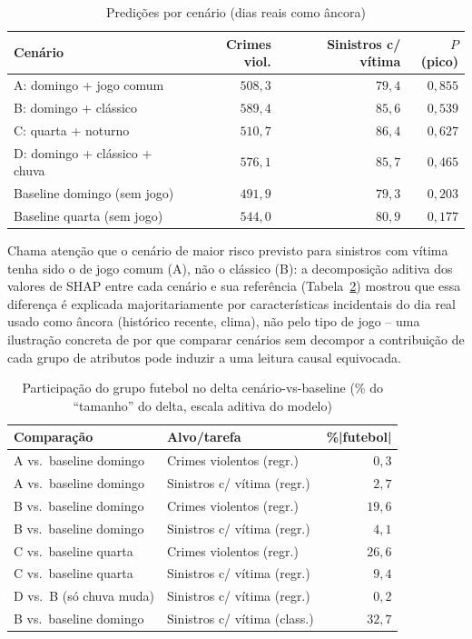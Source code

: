 \documentclass[12pt]{article}
\begin{document}
\begin{table}[ht]
\centering
\caption{Predições por cenário (dias reais como âncora)}
\label{tab:cenarios}
\small
\begin{tabular}{@{}lrrr@{}}
\toprule
\textbf{Cenário} & \textbf{Crimes viol.} & \textbf{Sinistros c/ vítima} & \textbf{$P$(pico)} \\
\midrule
A: domingo + jogo comum      & $508,3$ & $79,4$ & $0,855$ \\
B: domingo + clássico        & $589,4$ & $85,6$ & $0,539$ \\
C: quarta + noturno          & $510,7$ & $86,4$ & $0,627$ \\
D: domingo + clássico + chuva & $576,1$ & $85,7$ & $0,465$ \\
Baseline domingo (sem jogo)  & $491,9$ & $79,3$ & $0,203$ \\
Baseline quarta (sem jogo)   & $544,0$ & $80,9$ & $0,177$ \\
\bottomrule
\end{tabular}
\end{table}

Chama atenção que o cenário de maior risco previsto para sinistros com
vítima tenha sido o de jogo comum (A), não o clássico (B): a decomposição
aditiva dos valores de SHAP entre cada cenário e sua referência
(Tabela~\ref{tab:decomposicao}) mostrou que essa diferença é explicada
majoritariamente por características incidentais do dia real usado como
âncora (histórico recente, clima), não pelo tipo de jogo -- uma
ilustração concreta de por que comparar cenários sem decompor a
contribuição de cada grupo de atributos pode induzir a uma leitura
causal equivocada.

\begin{table}[ht]
\centering
\caption{Participação do grupo futebol no delta cenário-vs-baseline (\%
do ``tamanho'' do delta, escala aditiva do modelo)}
\label{tab:decomposicao}
\small
\begin{tabular}{@{}llr@{}}
\toprule
\textbf{Comparação} & \textbf{Alvo/tarefa} & \textbf{\%|futebol|} \\
\midrule
A vs.\ baseline domingo & Crimes violentos (regr.)    & $0,3$  \\
A vs.\ baseline domingo & Sinistros c/ vítima (regr.) & $2,7$  \\
B vs.\ baseline domingo & Crimes violentos (regr.)    & $19,6$ \\
B vs.\ baseline domingo & Sinistros c/ vítima (regr.) & $4,1$  \\
C vs.\ baseline quarta  & Crimes violentos (regr.)    & $26,6$ \\
C vs.\ baseline quarta  & Sinistros c/ vítima (regr.) & $9,4$  \\
D vs.\ B (só chuva muda) & Sinistros c/ vítima (regr.) & $0,2$  \\
B vs.\ baseline domingo & Sinistros c/ vítima (class.) & $32,7$ \\
\bottomrule
\end{tabular}
\end{table}
\end{document}
